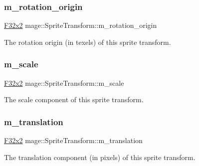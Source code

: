 \subsubsection{\texorpdfstring{m\+\_\+rotation\+\_\+origin}{m\_rotation\_origin}}
{\footnotesize\ttfamily \mbox{\hyperlink{namespacemage_a9dc0d34d6ecc87e4cfa4a826102117bc}{F32x2}} mage\+::\+Sprite\+Transform\+::m\+\_\+rotation\+\_\+origin\hspace{0.3cm}{\ttfamily [private]}}

The rotation origin (in texels) of this sprite transform. \mbox{\label{classmage_1_1_sprite_transform_a2995048f52d8d90d003ea421d58772be}} 
\subsubsection{\texorpdfstring{m\+\_\+scale}{m\_scale}}
{\footnotesize\ttfamily \mbox{\hyperlink{namespacemage_a9dc0d34d6ecc87e4cfa4a826102117bc}{F32x2}} mage\+::\+Sprite\+Transform\+::m\+\_\+scale\hspace{0.3cm}{\ttfamily [private]}}

The scale component of this sprite transform. \mbox{\label{classmage_1_1_sprite_transform_a4006065eb65336fceffa36a5c2c45e59}} 
\subsubsection{\texorpdfstring{m\+\_\+translation}{m\_translation}}
{\footnotesize\ttfamily \mbox{\hyperlink{namespacemage_a9dc0d34d6ecc87e4cfa4a826102117bc}{F32x2}} mage\+::\+Sprite\+Transform\+::m\+\_\+translation\hspace{0.3cm}{\ttfamily [private]}}

The translation component (in pixels) of this sprite transform. 